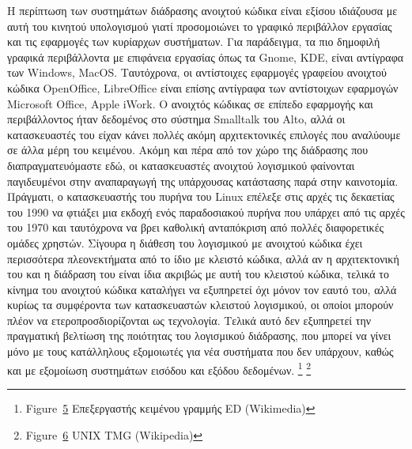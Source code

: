 \documentclass[
]{article}
\begin{document}
Η περίπτωση των συστημάτων διάδρασης ανοιχτού κώδικα είναι εξίσου
ιδιάζουσα με αυτή του κινητού υπολογισμού γιατί προσομοιώνει το γραφικό
περιβάλλον εργασίας και τις εφαρμογές των κυρίαρχων συστήματων. Για
παράδειγμα, τα πιο δημοφιλή γραφικά περιβάλλοντα με επιφάνεια εργασίας
όπως τα Gnome, KDE, είναι αντίγραφα των Windows, MacOS. Ταυτόχρονα, οι
αντίστοιχες εφαρμογές γραφείου ανοιχτού κώδικα OpenOffice, LibreOffice
είναι επίσης αντίγραφα των αντίστοιχων εφαρμογών Microsoft Office, Apple
iWork. Ο ανοιχτός κώδικας σε επίπεδο εφαρμογής και περιβάλλοντος ήταν
δεδομένος στο σύστημα Smalltalk του Alto, αλλά οι κατασκευαστές του
είχαν κάνει πολλές ακόμη αρχιτεκτονικές επιλογές που αναλύουμε σε άλλα
μέρη του κειμένου. Ακόμη και πέρα από τον χώρο της διάδρασης που
διαπραγματευόμαστε εδώ, οι κατασκευαστές ανοιχτού λογισμικού φαίνονται
παγιδευμένοι στην αναπαραγωγή της υπάρχουσας κατάστασης παρά στην
καινοτομία. Πράγματι, ο κατασκευαστής του πυρήνα του Linux επέλεξε στις
αρχές τις δεκαετίας του 1990 να φτιάξει μια εκδοχή ενός παραδοσιακού
πυρήνα που υπάρχει από τις αρχές του 1970 και ταυτόχρονα να βρει
καθολική ανταπόκριση από πολλές διαφορετικές ομάδες χρηστών. Σίγουρα η
διάθεση του λογισμικού με ανοιχτού κώδικα έχει περισσότερα πλεονεκτήματα
από το ίδιο με κλειστό κώδικα, αλλά αν η αρχιτεκτονική του και η
διάδραση του είναι ίδια ακριβώς με αυτή του κλειστού κώδικα, τελικά το
κίνημα του ανοιχτού κώδικα καταλήγει να εξυπηρετεί όχι μόνον τον εαυτό
του, αλλά κυρίως τα συμφέροντα των κατασκευαστών κλειστού λογισμικού, οι
οποίοι μπορούν πλέον να ετεροπροσδιορίζονται ως τεχνολογία. Τελικά αυτό
δεν εξυπηρετεί την πραγματική βελτίωση της ποιότητας του λογισμικού
διάδρασης, που μπορεί να γίνει μόνο με τους κατάλληλους εξομοιωτές για
νέα συστήματα που δεν υπάρχουν, καθώς και με εξομοίωση συστημάτων
εισόδου και εξόδου δεδομένων. \footnote{Figure~\protect\hyperlink{fig:ed-editor}{5}
  Επεξεργαστής κειμένου γραμμής ED (Wikimedia)} \footnote{Figure~\protect\hyperlink{fig:unix-tmg}{6}
  UNIX TMG (Wikipedia)}
\end{document}
